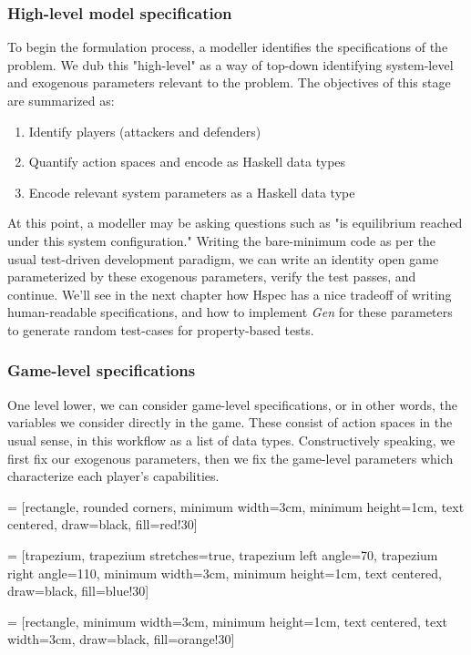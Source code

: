 \subsubsection{High-level model specification}
To begin the formulation process, a modeller identifies the specifications of the problem. We dub this "high-level" as a way of top-down identifying system-level and exogenous parameters relevant to the problem. The objectives of this stage are summarized as: 
\begin{enumerate}
	\item Identify players (attackers and defenders)
	\item Quantify action spaces and encode as Haskell data types
	\item Encode relevant system parameters as a Haskell data type
\end{enumerate}

At this point, a modeller may be asking questions such as "is equilibrium reached under this system configuration." Writing the bare-minimum code as per the usual test-driven development paradigm, we can write an identity open game parameterized by these exogenous parameters, verify the test passes, and continue. We'll see in the next chapter how Hspec has a nice tradeoff of writing human-readable specifications, and how to implement \textit{Gen} for these parameters to generate random test-cases for property-based tests. 

\subsubsection{Game-level specifications}
One level lower, we can consider game-level specifications, or in other words, the variables we consider directly in the game. These consist of action spaces in the usual sense, in this workflow as a list of data types. Constructively speaking, we first fix our exogenous parameters, then we fix the game-level parameters which characterize each player's capabilities.
 

 = [rectangle, rounded corners, 
minimum width=3cm, 
minimum height=1cm,
text centered, 
draw=black, 
fill=red!30]

 = [trapezium, 
trapezium stretches=true, %
trapezium left angle=70, 
trapezium right angle=110, 
minimum width=3cm, 
minimum height=1cm, text centered, 
draw=black, fill=blue!30]

 = [rectangle, 
minimum width=3cm, 
minimum height=1cm, 
text centered, 
text width=3cm, 
draw=black, 
fill=orange!30]

